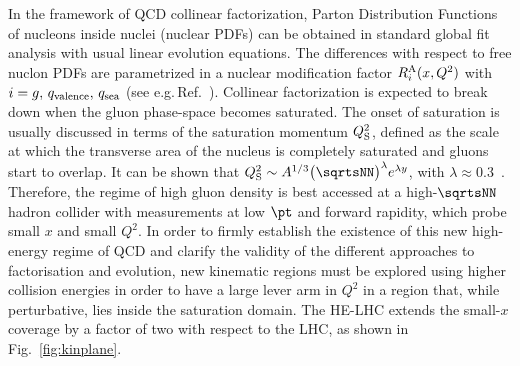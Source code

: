 \documentclass[../report.tex]{subfiles}
\begin{document}
In the framework of QCD collinear factorization, Parton Distribution Functions of nucleons inside nuclei (nuclear PDFs) can be obtained in standard global fit analysis with usual linear evolution equations. 
The differences with respect to free nuclon PDFs are parametrized in a nuclear modification factor
$R_i^{\rm A}(x,Q^2)$ with $i=g,\,q_{\rm valence},\,q_{\rm sea}$ (see e.g.\,Ref.~\cite{Arneodo:1992wf}).
Collinear factorization 
is expected to break down when the gluon phase-space becomes saturated.
The onset of saturation is usually discussed in terms of the 
saturation momentum $Q_{\rm S}^2$, defined as the 
scale at which the transverse area of the nucleus is completely saturated and gluons start to overlap.
It can be shown that $Q^2_{\rm S} \sim {A}^{1/3} \big(\sqrtsNN\big)^\lambda e^{\lambda y}$,  with $\lambda \approx 0.3$~\cite{Dainese:2016gch}.
Therefore, the regime of high gluon density is best accessed at a high-$\sqrtsNN$ hadron 
collider  with measurements at low $\pt$ and forward rapidity, which probe small $x$ and small $Q^2$.
In order to firmly establish the existence of this new high-energy regime of QCD and clarify the validity of the different approaches to factorisation and evolution, new kinematic regions must be explored using higher collision energies in order to have a large lever arm in $Q^2$ in a region that, while perturbative, lies inside the saturation domain. The HE-LHC extends the small-$x$ coverage by a factor of two with respect to the LHC, as shown in Fig.~\ref{fig:kinplane}. 
\end{document}
